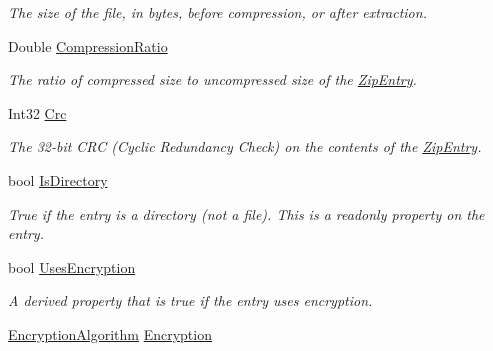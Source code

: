 \begin{DoxyCompactItemize}
\begin{DoxyCompactList}\small\item\em The size of the file, in bytes, before compression, or after extraction. \end{DoxyCompactList}\item 
Double \mbox{\hyperlink{class_super_tiled2_unity_1_1_ionic_1_1_zip_1_1_zip_entry_af0d953dffdfe37b0578bdd9b7a828361}{Compression\+Ratio}}
\begin{DoxyCompactList}\small\item\em The ratio of compressed size to uncompressed size of the \mbox{\hyperlink{class_super_tiled2_unity_1_1_ionic_1_1_zip_1_1_zip_entry}{Zip\+Entry}}. \end{DoxyCompactList}\item 
Int32 \mbox{\hyperlink{class_super_tiled2_unity_1_1_ionic_1_1_zip_1_1_zip_entry_a4b24fadb05fd70564b92f6618343aa87}{Crc}}
\begin{DoxyCompactList}\small\item\em The 32-\/bit C\+RC (Cyclic Redundancy Check) on the contents of the \mbox{\hyperlink{class_super_tiled2_unity_1_1_ionic_1_1_zip_1_1_zip_entry}{Zip\+Entry}}. \end{DoxyCompactList}\item 
bool \mbox{\hyperlink{class_super_tiled2_unity_1_1_ionic_1_1_zip_1_1_zip_entry_ad15b658412856468c7f75983c6f9de11}{Is\+Directory}}
\begin{DoxyCompactList}\small\item\em True if the entry is a directory (not a file). This is a readonly property on the entry. \end{DoxyCompactList}\item 
bool \mbox{\hyperlink{class_super_tiled2_unity_1_1_ionic_1_1_zip_1_1_zip_entry_a3aeaf32e0d2adbe6a5aaf1a70e1a6e7b}{Uses\+Encryption}}
\begin{DoxyCompactList}\small\item\em A derived property that is {\ttfamily true} if the entry uses encryption. \end{DoxyCompactList}\item 
\mbox{\hyperlink{namespace_super_tiled2_unity_1_1_ionic_1_1_zip_aa3f4e8aa12ef827ac72177a49b4e28e6}{Encryption\+Algorithm}} \mbox{\hyperlink{class_super_tiled2_unity_1_1_ionic_1_1_zip_1_1_zip_entry_ab8de4882ffe896d2657b27264807ef1c}{Encryption}}

\end{DoxyCompactItemize}
